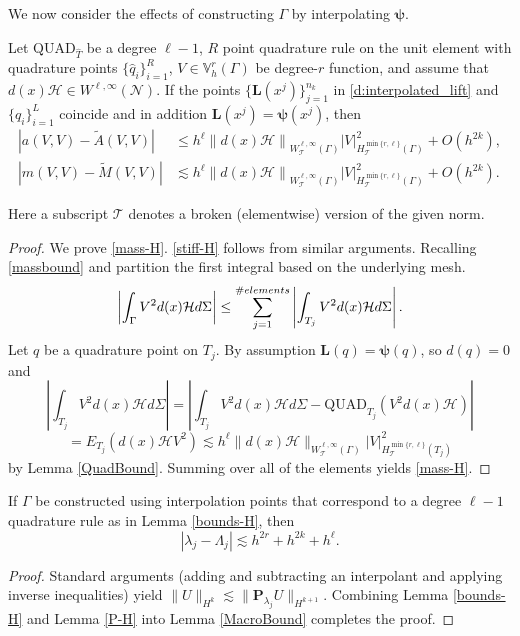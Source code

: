 \documentclass{siamart0516}
\newcommand{\Vh}{\mathbb{V}_{h}}
\newcommand{\bpsi}{\ensuremath{\boldsymbol \psi}}
\newcommand{\bL}{\ensuremath{\boldsymbol L}}
\numberwithin{equation}{section}
\numberwithin{theorem}{section}
\numberwithin{figure}{section}
\begin{document}
We now consider the effects of constructing $\Gamma$ by interpolating $\bpsi$.  
\begin{lemma} \label{bounds-H}	
Let $\text{QUAD}_{\hat{T}}$ be a degree $\ell-1$, $R$ point quadrature rule on the unit element with quadrature points $\{\hat{q}_i\}_{i=1}^R$, $V\in \Vh^r(\Gamma)$ be degree-$r$ function, and assume that $d(x)\mathcal{H}\in W^{\ell,\infty}(\mathcal{N})$. If the points $\{\bL(x^j)\}_{j=1}^{n_k}$ in \eqref{d:interpolated_lift} and $\{q_i\}_{i=1}^L$ coincide and in addition $\bL(x^j)=\bpsi(x^j)$, then
	\begin{align}
		|a(V,V)-\widetilde{A}(V,V)|&\leq
		h^\ell\left \|d(x)\mathcal{H}\right \|_{W_{\mathcal{T}}^{\ell,\infty}(\Gamma)}
		\left | V\right |_{H_{\mathcal{T}}^{\min\{r,\ell\}}(\Gamma)}^2+ O(h^{2k}),
	\label{stiff-H}	
\\
		|m(V,V)-\widetilde{M}(V,V)|&\lesssim h^{\ell}\left\|d(x)\mathcal{H}\right\|_{W_{\mathcal{T}}^{\ell,\infty}(\Gamma)}|V|_{H_{\mathcal{T}}^{\min\{r,\ell\}}(\Gamma)}^2 + O(h^{2k}).
	\label{mass-H}	
	\end{align}
\end{lemma}
Here a subscript $\mathcal{T}$ denotes a broken (elementwise) version of the given norm. 
\begin{proof}
	We prove \eqref{mass-H}.  \eqref{stiff-H} follows from similar arguments. Recalling \eqref{massbound} and partition the first integral based on the underlying mesh.
	$$
	\left|\int_{\Gamma}V^2d(x)\mathcal{H}d\Sigma\right|
	\leq
	\sum_{j=1}^{\# \space elements}\left|\int_{T_j}V^2d(x)\mathcal{H}d\Sigma\right|.
	$$
	Let $q$ be a quadrature point on $T_j$.  By assumption $\bL(q)=\bpsi(q)$, so $d(q) = 0$ and  
	$$
	\left|\int_{T_j}V^2d(x)\mathcal{H}d\Sigma\right| = \left|\int_{T_j}V^2d(x)\mathcal{H}d\Sigma - \text{QUAD}_{T_j}\left(V^2d(x)\mathcal{H}\right)\right|
	$$
	$$
	=E_{T_j}(d(x)\mathcal{H}V^2)
	\lesssim
	h^{\ell}\|d(x)\mathcal{H}\|_{W_{\mathcal{T}}^{\ell,\infty}(\Gamma)}|V|_{H_{\mathcal{T}}^{\min\{r,\ell\}}(T_j)}^2
	$$
	by Lemma \ref{QuadBound}. Summing over all of the elements yields \eqref{mass-H}.
\end{proof}



\begin{theorem} \label{Superconvergence}
If $\Gamma$ be constructed using interpolation points that correspond to a degree $\ell-1$ quadrature rule as in Lemma \ref{bounds-H}, then 
\begin{equation} \label{theorem_bound}
|\lambda_j-\Lambda_j|\lesssim h^{2r} + h^{2k} + h^\ell.
\end{equation}
\end{theorem}
\begin{proof}
Standard arguments (adding and subtracting an interpolant and applying inverse inequalities) yield $\|U\|_{H^k}\lesssim\|\mathbf{P}_{\lambda_j}U\|_{H^{k+1}}$.  Combining Lemma \ref{bounds-H} and Lemma \ref{P-H} into Lemma \ref{MacroBound} completes the proof.
\end{proof}
\end{document}
